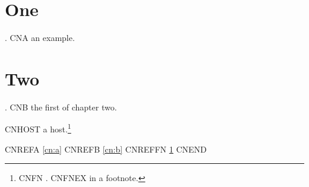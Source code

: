 \documentclass[11pt]{report}
\begin{document}
\chapter{One}
\ex. \label{cn:a} CNA an example.

\chapter{Two}
\ex. \label{cn:b} CNB the first of chapter two.

CNHOST a host.\footnote{CNFN \ex. \label{cn:fn} CNFNEX in a footnote.}

CNREFA \ref{cn:a} CNREFB \ref{cn:b} CNREFFN \ref{cn:fn} CNEND
\end{document}
